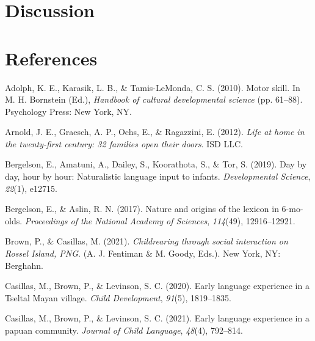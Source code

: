 \documentclass[10pt, letterpaper]{article}
\newenvironment{CSLReferences}%
  {}%
  {\par}
\begin{document}
\hypertarget{discussion}{%
\section{Discussion}\label{discussion}}

\hypertarget{references}{%
\section{References}\label{references}}

\setlength{\parindent}{-0.1in} 
\setlength{\leftskip}{0.125in}

\noindent

\hypertarget{refs}{}
\begin{CSLReferences}{1}{0}
\leavevmode\hypertarget{ref-adolph2010motor}{}%
Adolph, K. E., Karasik, L. B., \& Tamis-LeMonda, C. S. (2010). Motor
skill. In M. H. Bornstein (Ed.), \emph{Handbook of cultural
developmental science} (pp. 61--88). Psychology Press: New York, NY.

\leavevmode\hypertarget{ref-arnold2012life}{}%
Arnold, J. E., Graesch, A. P., Ochs, E., \& Ragazzini, E. (2012).
\emph{Life at home in the twenty-first century: 32 families open their
doors}. ISD LLC.

\leavevmode\hypertarget{ref-bergelson2019day}{}%
Bergelson, E., Amatuni, A., Dailey, S., Koorathota, S., \& Tor, S.
(2019). Day by day, hour by hour: Naturalistic language input to
infants. \emph{Developmental Science}, \emph{22}(1), e12715.

\leavevmode\hypertarget{ref-bergelson2017nature}{}%
Bergelson, E., \& Aslin, R. N. (2017). Nature and origins of the lexicon
in 6-mo-olds. \emph{Proceedings of the National Academy of Sciences},
\emph{114}(49), 12916--12921.

\leavevmode\hypertarget{ref-brownIPchildrearing}{}%
Brown, P., \& Casillas, M. (2021). \emph{Childrearing through social
interaction on {Rossel Island, PNG}}. (A. J. Fentiman \& M. Goody,
Eds.). New York, NY: Berghahn.

\leavevmode\hypertarget{ref-casillas2020early}{}%
Casillas, M., Brown, P., \& Levinson, S. C. (2020). Early language
experience in a {Tseltal Mayan} village. \emph{Child Development},
\emph{91}(5), 1819--1835.

\leavevmode\hypertarget{ref-casillas2021early}{}%
Casillas, M., Brown, P., \& Levinson, S. C. (2021). Early language
experience in a papuan community. \emph{Journal of Child Language},
\emph{48}(4), 792--814.


\end{CSLReferences}
\end{document}
